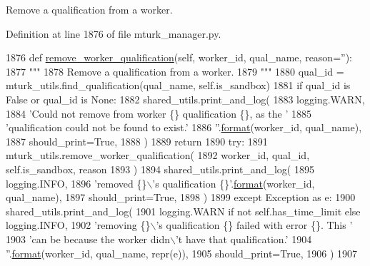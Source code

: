 \begin{DoxyVerb}Remove a qualification from a worker.
\end{DoxyVerb}
 

Definition at line 1876 of file mturk\+\_\+manager.\+py.


\begin{DoxyCode}
1876     \textcolor{keyword}{def }\hyperlink{namespaceparlai_1_1mturk_1_1core_1_1dev_1_1mturk__utils_abc2c057b91641179f7c4bb50dd916488}{remove\_worker\_qualification}(self, worker\_id, qual\_name, reason=''):
1877         \textcolor{stringliteral}{"""}
1878 \textcolor{stringliteral}{        Remove a qualification from a worker.}
1879 \textcolor{stringliteral}{        """}
1880         qual\_id = mturk\_utils.find\_qualification(qual\_name, self.is\_sandbox)
1881         \textcolor{keywordflow}{if} qual\_id \textcolor{keywordflow}{is} \textcolor{keyword}{False} \textcolor{keywordflow}{or} qual\_id \textcolor{keywordflow}{is} \textcolor{keywordtype}{None}:
1882             shared\_utils.print\_and\_log(
1883                 logging.WARN,
1884                 \textcolor{stringliteral}{'Could not remove from worker \{\} qualification \{\}, as the '}
1885                 \textcolor{stringliteral}{'qualification could not be found to exist.'}
1886                 \textcolor{stringliteral}{''}.\hyperlink{namespaceparlai_1_1chat__service_1_1services_1_1messenger_1_1shared__utils_a32e2e2022b824fbaf80c747160b52a76}{format}(worker\_id, qual\_name),
1887                 should\_print=\textcolor{keyword}{True},
1888             )
1889             \textcolor{keywordflow}{return}
1890         \textcolor{keywordflow}{try}:
1891             mturk\_utils.remove\_worker\_qualification(
1892                 worker\_id, qual\_id, self.is\_sandbox, reason
1893             )
1894             shared\_utils.print\_and\_log(
1895                 logging.INFO,
1896                 \textcolor{stringliteral}{'removed \{\}\(\backslash\)'s qualification \{\}'}.\hyperlink{namespaceparlai_1_1chat__service_1_1services_1_1messenger_1_1shared__utils_a32e2e2022b824fbaf80c747160b52a76}{format}(worker\_id, qual\_name),
1897                 should\_print=\textcolor{keyword}{True},
1898             )
1899         \textcolor{keywordflow}{except} Exception \textcolor{keyword}{as} e:
1900             shared\_utils.print\_and\_log(
1901                 logging.WARN \textcolor{keywordflow}{if} \textcolor{keywordflow}{not} self.has\_time\_limit \textcolor{keywordflow}{else} logging.INFO,
1902                 \textcolor{stringliteral}{'removing \{\}\(\backslash\)'s qualification \{\} failed with error \{\}. This '}
1903                 \textcolor{stringliteral}{'can be because the worker didn\(\backslash\)'t have that qualification.'}
1904                 \textcolor{stringliteral}{''}.\hyperlink{namespaceparlai_1_1chat__service_1_1services_1_1messenger_1_1shared__utils_a32e2e2022b824fbaf80c747160b52a76}{format}(worker\_id, qual\_name, repr(e)),
1905                 should\_print=\textcolor{keyword}{True},
1906             )
1907 
\end{DoxyCode}
